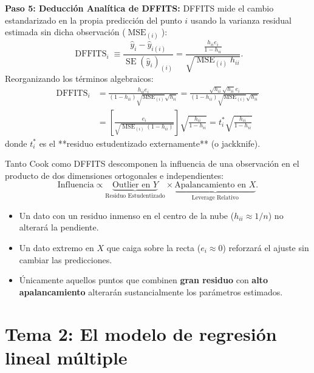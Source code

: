 \documentclass[11pt,a4paper]{article}
\begin{document}
\begin{demobox}
\textbf{Paso 5: Deducción Analítica de DFFITS:}  
DFFITS mide el cambio estandarizado en la propia predicción del punto $i$ usando la varianza residual estimada sin dicha observación ($\operatorname{MSE}_{(i)}$):
\begin{equation}
\operatorname{DFFITS}_i \equiv \frac{\hat{y}_i - \hat{y}_{i(i)}}{\operatorname{SE}(\hat{y}_i)_{(i)}} = \frac{\frac{h_{ii} e_i}{1 - h_{ii}}}{\sqrt{\operatorname{MSE}_{(i)} h_{ii}}}.
\end{equation}
Reorganizando los términos algebraicos:
\begin{align}
\operatorname{DFFITS}_i &= \frac{h_{ii} e_i}{(1 - h_{ii}) \sqrt{\operatorname{MSE}_{(i)}} \sqrt{h_{ii}}} = \frac{\sqrt{h_{ii}} \sqrt{h_{ii}} e_i}{(1 - h_{ii}) \sqrt{\operatorname{MSE}_{(i)}} \sqrt{h_{ii}}} \\
&= \left[ \frac{e_i}{\sqrt{\operatorname{MSE}_{(i)}(1 - h_{ii})}} \right] \sqrt{\frac{h_{ii}}{1 - h_{ii}}} = t_i^* \sqrt{\frac{h_{ii}}{1 - h_{ii}}}
\end{align}
donde $t_i^*$ es el **residuo estudentizado externamente** (o jackknife).
\end{demobox}

\begin{intuicionbox}
Tanto Cook como DFFITS descomponen la influencia de una observación en el producto de dos dimensiones ortogonales e independientes:
\begin{equation}
\text{Influencia} \propto \underbrace{\text{Outlier en } Y}_{\text{Residuo Estudentizado}} \times \underbrace{\text{Apalancamiento en } X}_{\text{Leverage Relativo}}.
\end{equation}
\begin{itemize}
    \item Un dato con un residuo inmenso en el centro de la nube ($h_{ii} \approx 1/n$) no alterará la pendiente.
    \item Un dato extremo en $X$ que caiga sobre la recta ($e_i \approx 0$) reforzará el ajuste sin cambiar las predicciones.
    \item Únicamente aquellos puntos que combinen \textbf{gran residuo} con \textbf{alto apalancamiento} alterarán sustancialmente los parámetros estimados.
\end{itemize}
\end{intuicionbox}



\newpage
\section{Tema 2: El modelo de regresión lineal múltiple}
\end{document}
